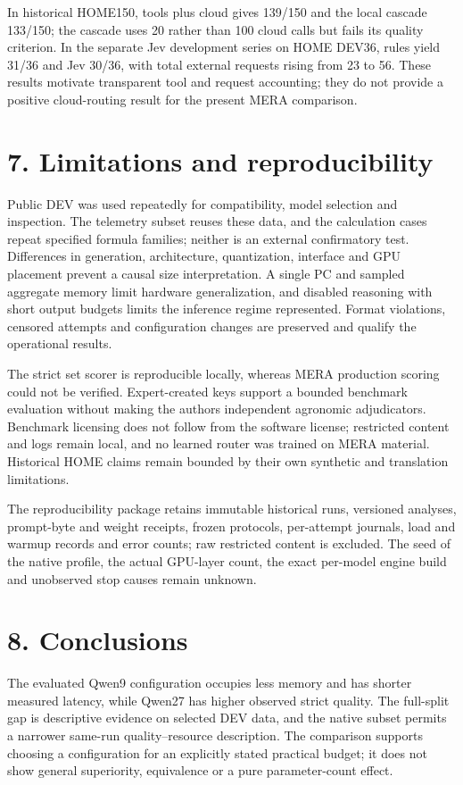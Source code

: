 \documentclass[10pt,a4paper]{article}
\begin{document}
In historical HOME150, tools plus cloud gives 139/150 and the local cascade 133/150; the cascade uses 20 rather than 100 cloud calls but fails its quality criterion. In the separate Jev development series on HOME DEV36, rules yield 31/36 and Jev 30/36, with total external requests rising from 23 to 56. These results motivate transparent tool and request accounting; they do not provide a positive cloud-routing result for the present MERA comparison.

\section*{7. Limitations and reproducibility}
Public DEV was used repeatedly for compatibility, model selection and inspection. The telemetry subset reuses these data, and the calculation cases repeat specified formula families; neither is an external confirmatory test. Differences in generation, architecture, quantization, interface and GPU placement prevent a causal size interpretation. A single PC and sampled aggregate memory limit hardware generalization, and disabled reasoning with short output budgets limits the inference regime represented. Format violations, censored attempts and configuration changes are preserved and qualify the operational results.

The strict set scorer is reproducible locally, whereas MERA production scoring could not be verified. Expert-created keys support a bounded benchmark evaluation without making the authors independent agronomic adjudicators. Benchmark licensing does not follow from the software license; restricted content and logs remain local, and no learned router was trained on MERA material. Historical HOME claims remain bounded by their own synthetic and translation limitations.

The reproducibility package retains immutable historical runs, versioned analyses, prompt-byte and weight receipts, frozen protocols, per-attempt journals, load and warmup records and error counts; raw restricted content is excluded. The seed of the native profile, the actual GPU-layer count, the exact per-model engine build and unobserved stop causes remain unknown.

\section*{8. Conclusions}
The evaluated Qwen9 configuration occupies less memory and has shorter measured latency, while Qwen27 has higher observed strict quality. The full-split gap is descriptive evidence on selected DEV data, and the native subset permits a narrower same-run quality–resource description. The comparison supports choosing a configuration for an explicitly stated practical budget; it does not show general superiority, equivalence or a pure parameter-count effect.
\end{document}

